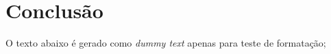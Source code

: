 \chapter{Conclusão}

O texto abaixo é gerado como \textit{dummy text} apenas para teste de formatação;

\lipsum